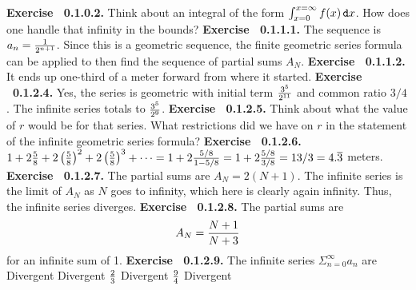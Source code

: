 \par 
 {\noindent \protect \bf  Exercise ~0.1.0.2.} Think about an integral of the form $\intop _{x=0}^{x=\infty }f(x)\mathop {}\protect \tmspace  -\thinmuskip {.1667em}\protect \mathtt  {d}x $. How does one handle that infinity in the bounds? \protect \newline  \protect \newline  
 {\noindent \protect \bf  Exercise ~0.1.1.1.} The sequence is $a_n=\protect \frac  {1}{2^{n+1}}$. Since this is a geometric sequence, the finite geometric series formula can be applied to then find the sequence of partial sums $A_N$. \protect \newline  \protect \newline  
 {\noindent \protect \bf  Exercise ~0.1.1.2.} It ends up one-third of a meter forward from where it started. \protect \newline  \protect \newline  
 {\noindent \protect \bf  Exercise ~0.1.2.4.} Yes, the series is geometric with initial term $\protect \frac  {3^5}{2^{11}}$ and common ratio $3/4$. The infinite series totals to $ \protect \frac  {3^5}{2^9}$. \protect \newline  \protect \newline  
 {\noindent \protect \bf  Exercise ~0.1.2.5.} Think about what the value of $r$ would be for that series. What restrictions did we have on $r$ in the statement of the infinite geometric series formula? \protect \newline  \protect \newline  
 {\noindent \protect \bf  Exercise ~0.1.2.6.} $1+2\protect \frac  {5}{8}+2\left (\protect \frac  {5}{8}\right )^2+2\left (\protect \frac  {5}{8}\right )^3+\protect \cdots  =1+2\protect \frac  {5/8}{1-5/8}=1+2\protect \frac  {5/8}{3/8}=13/3=4.\protect \overline  {3}$ meters. \protect \newline  \protect \newline  
 {\noindent \protect \bf  Exercise ~0.1.2.7.} The partial sums are $A_N=2(N+1)$. The infinite series is the limit of $A_N$ as $N$ goes to infinity, which here is clearly again infinity. Thus, the infinite series diverges. \protect \newline  \protect \newline  
 {\noindent \protect \bf  Exercise ~0.1.2.8.} The partial sums are $$A_N=\protect \frac  {N+1}{N+3}$$ for an infinite sum of 1. \protect \newline  \protect \newline  
 {\noindent \protect \bf  Exercise ~0.1.2.9.} The infinite series $\Sigma _{n=0}^{\infty }a_n$ are \textbullet Divergent \textbullet Divergent  \textbullet $\protect \frac  {2}{3}$ \textbullet Divergent \textbullet $\protect \frac  {9}{4}$ \textbullet Divergent  \protect \newline  \protect \newline  
